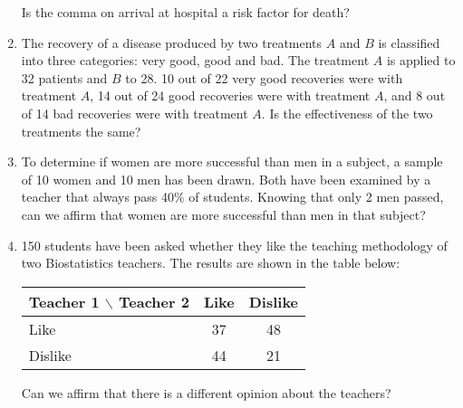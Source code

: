 \begin{enumerate}[leftmargin=*]
Is the comma on arrival at hospital a risk factor for death?

\item The recovery of a disease produced by two treatments $A$ and $B$ is classified into three categories: very good, good and bad. The treatment $A$ is applied to 32 patients and $B$ to 28. 10 out of 22 very good recoveries were with treatment $A$, 14 out of 24 good recoveries were with treatment $A$, and 8 out of 14 bad recoveries were with treatment $A$.
Is the effectiveness of the two treatments the same?

\item To determine if women are more successful than men in a subject, a sample of 10 women and 10 men has been drawn. Both have been examined by a teacher that always pass 40\% of students. Knowing that only 2 men passed, can we affirm that women are more successful than men in that subject?

\item 150 students have been asked whether they like the teaching methodology of two Biostatistics teachers. The results are shown in the table below:
\begin{center}
\begin{tabular}{|l|c|c|}
\cline{2-3}
\multicolumn{1}{c|}{Teacher 1 $\backslash$ Teacher 2} & Like & Dislike  \\
\hline
Like & 37 & 48  \\
\hline
Dislike & 44 & 21 \\
\hline
\end{tabular}
\end{center}

Can we affirm that there is a different opinion about the teachers?

\end{enumerate}

